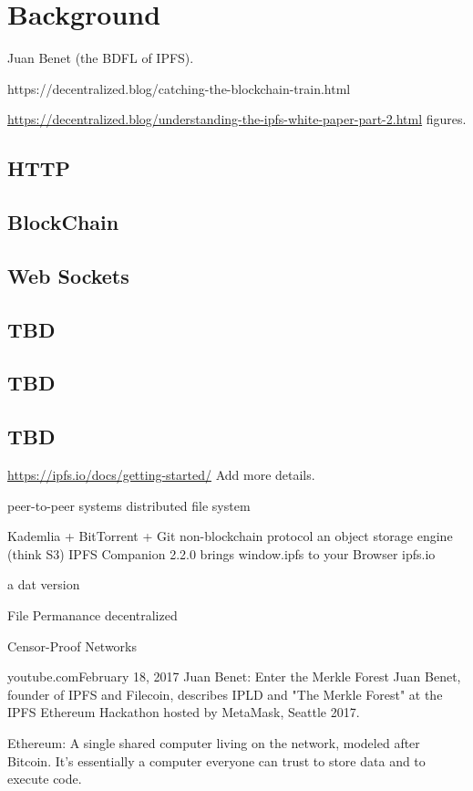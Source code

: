 
\section{Background}\label{seBackground}

Juan Benet (the BDFL of IPFS).

https://decentralized.blog/catching-the-blockchain-train.html

\url{https://decentralized.blog/understanding-the-ipfs-white-paper-part-2.html}
figures.

\subsection{HTTP}
\subsection{BlockChain}
\subsection{Web Sockets}
\subsection{TBD}
\subsection{TBD}
\subsection{TBD}


\url{https://ipfs.io/docs/getting-started/} Add more details.

peer-to-peer systems
distributed file system

Kademlia + BitTorrent + Git
non-blockchain protocol
an object storage engine (think S3)
IPFS Companion 2.2.0 brings window.ipfs to your Browser ipfs.io

a dat version

File Permanance
decentralized 

Censor-Proof Networks


youtube.comFebruary 18, 2017
Juan Benet: Enter the Merkle Forest
Juan Benet, founder of IPFS and Filecoin, describes IPLD and "The Merkle Forest" at the IPFS Ethereum Hackathon hosted by MetaMask, Seattle 2017.

{Ethereum: A single shared computer living on the network, modeled
  after Bitcoin. It's essentially a computer everyone can trust to
  store data and to execute code.}

